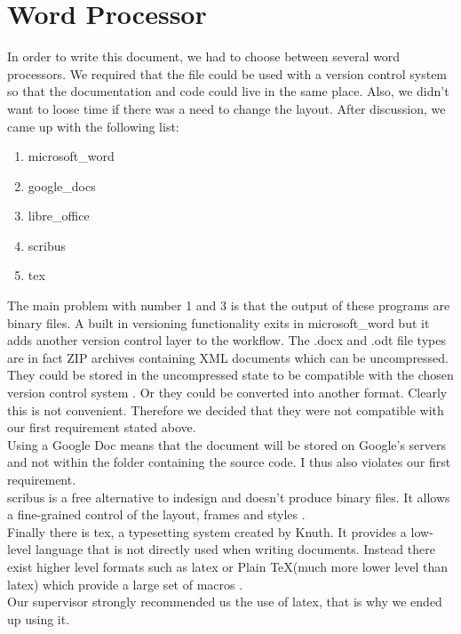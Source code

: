 \section{Word Processor}
In order to write this document, we had to choose between several word processors. We required that the file could be used with a version control system so that the documentation and code could live in the same place. Also, we didn't want to loose time if there was a need to change the layout. After discussion, we came up with the following list:
\begin{enumerate}
\item \Gls{microsoft_word}
\item \Gls{google_docs}
\item \Gls{libre_office}
\item \Gls{scribus}
\item \Gls{tex}
\end{enumerate}
The main problem with number 1 and 3 is that the output of these programs are binary files. A built in versioning functionality exits in \gls{microsoft_word} but it adds another version control layer to the workflow. The .docx and .odt file types are in fact ZIP archives containing XML documents which can be uncompressed. They could be stored in the uncompressed state to be compatible with the chosen version control system \cite{zipdocextension}. Or they could be converted into another format. Clearly this is not convenient. Therefore we decided that they were not compatible with our first requirement stated above.\\
Using a Google Doc means that the document will be stored on Google's servers and not within the folder containing the source code. I thus also violates our first requirement.\\
\Gls{scribus} is a free alternative to \gls{indesign} and doesn't produce binary files. It allows a fine-grained control of the layout, frames and styles \cite{ibm2013open}.\\
Finally there is \gls{tex}, a typesetting system created by Knuth. It provides a low-level language that is not directly used when writing documents. Instead there exist higher level formats such as \gls{latex} or Plain \TeX (much more lower level than \gls{latex}) which provide a large set of macros \cite{levels2017}.\\
Our supervisor strongly recommended us the use of \gls{latex}, that is why we ended up using it.